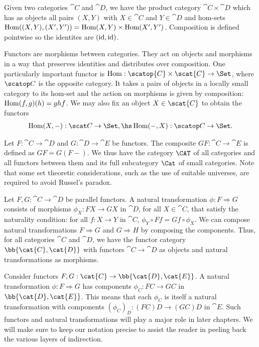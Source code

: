 Given two categories $\cat{C}$ and $\cat{D}$, we have the product category
$\cat{C}\times\cat{D}$ which has as objects all pairs $(X,Y)$ with $X\in\cat{C}$
and $Y\in\cat{D}$ and hom-sets $\operatorname{Hom}((X,Y),(X',Y'))=\operatorname{Hom}(X,Y)\times\operatorname{Hom}(X',Y')$.
Composition is defined pointwise so the identites are $(\operatorname{id},\operatorname{id})$.

Functors are morphisms between categories. They act on objects and morphisms in
a way that preserves identities and distributes over composition. One
particularly important functor is $\Hom : \scatop{C}\times\scat{C}\to\Set$,
where $\scatop C$ is the opposite category. It takes a pairs of objects in a locally small
category to its hom-set and the action on morphisms is given by composition:
$\operatorname{Hom}(f,g)(h) = ghf$. We may also fix an object $X\in\scat{C}$ to obtain the
functors
\begin{align*}
  \Hom(X,-):\scat C\to\Set, \hs \Hom(-,X):\scatop C\to\Set.
\end{align*}

Let $F:\cat{C}\to\cat{D}$ and $G:\cat{D}\to\cat{E}$ be functors. The composite
$GF:\cat{C}\to\cat{E}$ is defined as $GF = G(F-)$. We thus have the category
$\CAT$ of all categories and all functors between them and its full subcategory
$\Cat$ of small categories. Note that some set theoretic considerations, such
as the use of suitable universes, are required to avoid Russel's paradox.

Let $F,G:\cat{C}\to\cat{D}$ be parallel functors. A natural transformation $\phi
: F \Rightarrow G$ consists of morphisms $\phi_X : FX \to GX$ in $\cat{D}$, for
all $X\in\cat{C}$, that satisfy the naturality condition: for all $f:X\to Y$ in
$\cat{C}$, $\phi_Y\circ Ff = Gf\circ \phi_X$.
We can compose natural transformations $F\Rightarrow G$ and $G\Rightarrow H$ by
composing the components. Thus, for all categories $\cat{C}$ and $\cat{D}$, we
have the functor category $\bb{\cat{C},\cat{D}}$ with functors
$\cat{C}\to\cat{D}$ as objects and natural transformations as morphisms.

Consider functors $F,G:\cat{C}\to\bb{\cat{D},\cat{E}}$. A natural
transformation $\phi : F\Rightarrow G$ has components $\phi_C : FC\to GC$ in
$\bb{\cat{D},\cat{E}}$. This means that each $\phi_C$ is itself a natural
transformation with components $(\phi_C)_D : (FC)D \to (GC)D$ in
$\cat{E}$. Such functors and natural transformations will play a major role in
later chapters. We will make sure to keep our notation precise to assist the
reader in peeling back the various layers of indirection.

